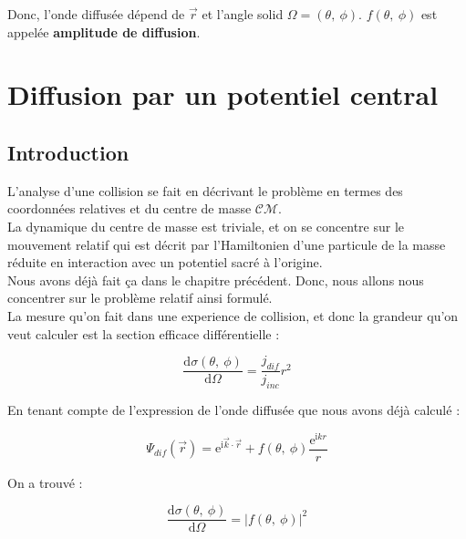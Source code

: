 \documentclass[12pt,a4paper,oneside,french]{book}
\renewcommand{\i}{\mathrm{i}}
\newcommand{\e}{\mathrm{e}}
\newcommand{\diff}{\mathrm{d}}
\theoremstyle{definition}
\theoremstyle{definition}
\theoremstyle{definition}
\theoremstyle{remark}
\theoremstyle{definition}
\begin{document}
    Donc, l'onde diffusée dépend de $\vec{r}$ et l'angle solid $\Omega = (\theta, \ \phi)$. $f(\theta, \ \phi)$ est appelée \textbf{amplitude de diffusion}. 
    
    
    
    \chapter{Diffusion par un potentiel central}
    
    \section{Introduction}
    L'analyse d'une collision se fait en décrivant le problème en termes des coordonnées relatives et du centre de masse $\mathcal{CM}$. \\
    
    La dynamique du centre de masse est triviale, et on se concentre sur le mouvement relatif qui est décrit par l'Hamiltonien d'une particule de la masse réduite en interaction avec un potentiel sacré à l'origine. \\
    
    Nous avons déjà fait ça dans le chapitre précédent. Donc, nous allons nous concentrer sur le problème relatif ainsi formulé. \\
    
    La mesure qu'on fait dans une experience de collision, et donc la grandeur qu'on veut calculer est la section efficace différentielle :
    
    \begin{equation*}
        \frac{\diff \sigma(\theta, \ \phi)}{\diff \Omega} = \frac{{j}_{dif}}{{j}_{inc}} {r}^{2}
    \end{equation*}
    
    En tenant compte de l'expression de l'onde diffusée que nous avons déjà calculé :
    
    \begin{equation*}
        {\Psi}_{dif}(\vec{r}) = {\e}^{\i \vec{k} \cdot \vec{r}} + f(\theta, \ \phi) \frac{{\e}^{\i k r}}{r}
    \end{equation*}
    
    On a trouvé :
    
    \begin{equation*}
        \frac{\diff \sigma(\theta, \ \phi)}{\diff \Omega} = {\left\lvert{f}(\theta, \ \phi)\right\rvert}^{2}
    \end{equation*}
    
\end{document}
